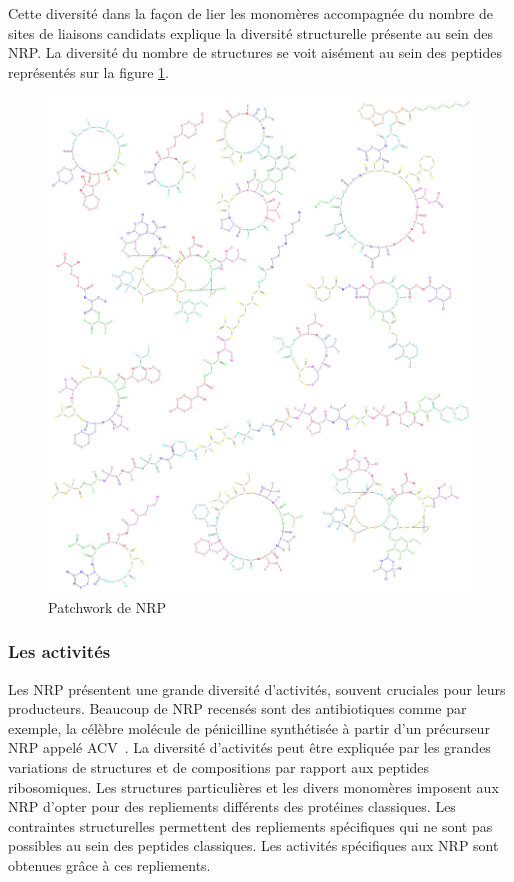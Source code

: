Cette diversité dans la façon de lier les monomères accompagnée du nombre de sites de liaisons candidats explique la diversité structurelle présente au sein des NRP.
La diversité du nombre de structures se voit aisément au sein des peptides représentés sur la figure \ref{peps_example}.

\begin{figure}[h!]
  \begin{center}
    \includegraphics[width=450px]{Figures/bio/Intro/NRPs/peps.png}
    \caption{\label{peps_example}Patchwork de NRP}
  \end{center}
\end{figure}


\subsubsection{Les activités}

Les NRP présentent une grande diversité d'activités, souvent cruciales pour leurs producteurs.
Beaucoup de NRP recensés sont des antibiotiques comme par exemple, la célèbre molécule de pénicilline synthétisée à partir d'un précurseur NRP appelé ACV~\cite{queener_molecular_1990}.
La diversité d'activités peut être expliquée par les grandes variations de structures et de compositions par rapport aux peptides ribosomiques.
Les structures particulières et les divers monomères imposent aux NRP d'opter pour des repliements différents des protéines classiques.
Les contraintes structurelles permettent des repliements spécifiques qui ne sont pas possibles au sein des peptides classiques.
Les activités spécifiques aux NRP sont obtenues grâce à ces repliements.

